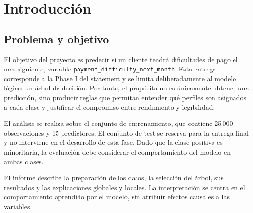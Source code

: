 \chapter{Introducción} \label{chp:intro}


\section{Problema y objetivo}

El objetivo del proyecto es predecir si un cliente tendrá dificultades de pago
el mes siguiente, variable \texttt{payment_difficulty_next_month}. Esta entrega
corresponde a la Phase I del statement y se limita deliberadamente al modelo
lógico: un árbol de decisión. Por tanto, el propósito no es únicamente obtener
una predicción, sino producir reglas que permitan entender qué perfiles son
asignados a cada clase y justificar el compromiso entre rendimiento y
legibilidad.

El análisis se realiza sobre el conjunto de entrenamiento, que contiene
25\,000 observaciones y 15 predictores. El conjunto de test se reserva para la
entrega final y no interviene en el desarrollo de esta fase. Dado que la clase
positiva es minoritaria, la evaluación debe considerar el comportamiento del
modelo en ambas clases.

El informe describe la preparación de los datos, la selección del árbol, sus
resultados y las explicaciones globales y locales. La interpretación se centra
en el comportamiento aprendido por el modelo, sin atribuir efectos causales a
las variables.

